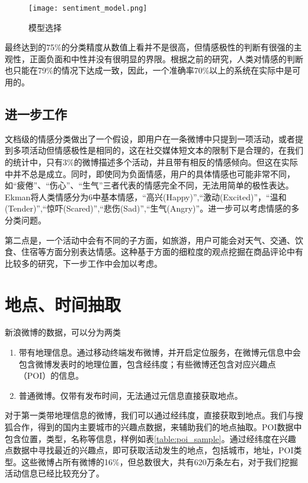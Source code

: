 \begin{figure}[!h]
\centering
\texttt{[image: sentiment\_model.png]}
\caption{模型选择}
\label{fig:sentiment_model}
\end{figure}

最终达到的75\%的分类精度从数值上看并不是很高，但情感极性的判断有很强的主观性，正面负面和中性并没有很明显的界限。根据之前的研究，人类对情感的判断也只能在79\%的情况下达成一致，因此，一个准确率70\%以上的系统在实际中是可用的。

\subsection{进一步工作}
文档级的情感分类做出了一个假设，即用户在一条微博中只提到一项活动，或者提到多项活动但情感极性是相同的，这在社交媒体短文本的限制下是合理的，在我们的统计中，只有3\%的微博描述多个活动，并且带有相反的情感倾向。但这在实际中并不总是成立。同时，即使同为负面情感，用户的具体情感也可能非常不同，如``疲倦''、``伤心''、``生气''三者代表的情感完全不同，无法用简单的极性表达。Ekman\cite{ekman1992argument}将人类情感分为6中基本情感，``高兴(Happy)'',``激动(Excited)''，``温和(Tender)'',``惊吓(Scared)'',``悲伤(Sad)'',``生气(Angry)''。进一步可以考虑情感的多分类问题。

第二点是，一个活动中会有不同的子方面，如旅游，用户可能会对天气、交通、饮食、住宿等方面分别表达情感。这种基于方面的细粒度的观点挖掘在商品评论中有比较多的研究，下一步工作中会加以考虑。

\section{地点、时间抽取}
新浪微博的数据，可以分为两类
\begin{enumerate}
\item 带有地理信息。通过移动终端发布微博，并开启定位服务，在微博元信息中会包含微博发表时的地理位置，包含经纬度；有些微博还包含对应兴趣点（POI）的信息。
\item 普通微博。仅带有发布时间，无法通过元信息直接获取地点。
\end{enumerate}

对于第一类带地理信息的微博，我们可以通过经纬度，直接获取到地点。我们与搜狐合作，得到的国内主要城市的兴趣点数据，来辅助我们的地点抽取。POI数据中包含位置，类型，名称等信息，样例如表\ref{table:poi_sample}。通过经纬度在兴趣点数据中寻找最近的兴趣点，即可获取活动发生的地点，包括城市，地址，POI类型。这些微博占所有微博的16\%，但总数很大，共有620万条左右，对于我们挖掘活动信息已经比较充分了。

